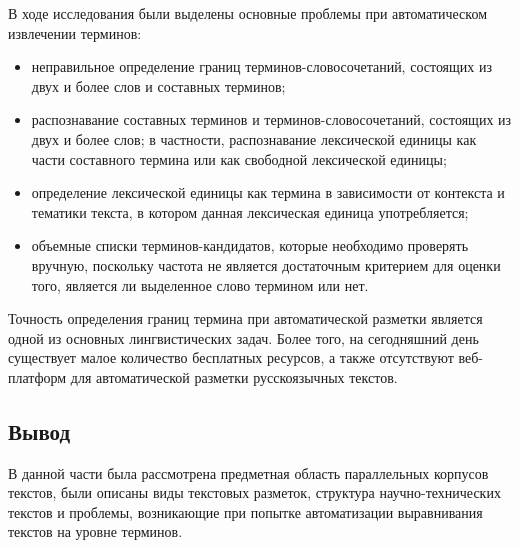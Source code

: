 В ходе исследования \cite{butenko2022} были выделены основные проблемы при автоматическом извлечении терминов:
\begin{itemize}
    \item неправильное определение границ терминов-словосочетаний, состоящих из двух и более слов и составных терминов; 
    \item  распознавание составных терминов и терминов-словосочетаний, состоящих из двух и более слов; в частности, распознавание лексической единицы как части составного термина или как свободной лексической единицы; 
    \item определение лексической единицы как термина в зависимости от контекста и тематики текста, в котором данная лексическая единица употребляется; 
    \item объемные списки терминов-кандидатов, которые необходимо проверять вручную, поскольку частота не является достаточным критерием для оценки того, является ли выделенное слово термином или нет. 
\end{itemize}

Точность определения границ термина при автоматической разметки является одной из основных лингвистических задач. Более того, на сегодняшний день существует малое количество бесплатных ресурсов, а также отсутствуют веб-платформ для автоматической разметки русскоязычных текстов.~\cite{butenko2022}

\subsection{Вывод}

В данной части была рассмотрена предметная область параллельных корпусов текстов, были описаны виды текстовых разметок, структура научно-технических текстов и проблемы, возникающие при попытке автоматизации выравнивания текстов на уровне терминов.
